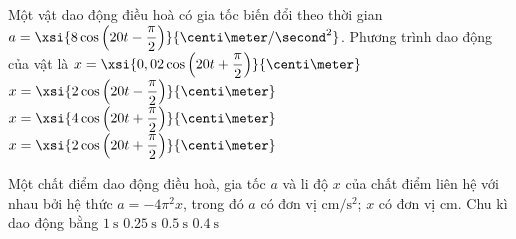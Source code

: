 \begin{ex}
	Một vật dao động điều hoà có gia tốc biến đổi theo thời gian $a=\xsi{8\cos\left(20t-\dfrac{\pi}{2}\right)}{\centi\meter/\second^2}$. Phương trình dao động của vật là
	\choice
	{\True $x=\xsi{0,02\cos\left(20t+\dfrac{\pi}{2}\right)}{\centi\meter}$}
	{$x=\xsi{2\cos\left(20t-\dfrac{\pi}{2}\right)}{\centi\meter}$}
	{$x=\xsi{4\cos\left(20t+\dfrac{\pi}{2}\right)}{\centi\meter}$}
	{$x=\xsi{2\cos\left(20t+\dfrac{\pi}{2}\right)}{\centi\meter}$}
\end{ex}
\begin{ex}
	Một chất điểm dao động điều hoà, gia tốc $a$ và li độ $x$ của chất điểm liên hệ với nhau bởi hệ thức $a=-4\pi^2x$, trong đó $a$ có đơn vị $\si{\centi\meter/\second^2}$; $x$ có đơn vị $\si{\centi\meter}$. Chu kì dao động bằng
	\choice
	{\True $\SI{1}{\second}$}
	{$\SI{0.25}{\second}$}
	{$\SI{0.5}{\second}$}
	{$\SI{0.4}{\second}$}
\end{ex}
